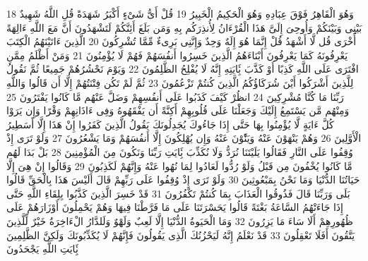 \documentclass[20pt,a4paper]{article}
\begin{document}
{\tiny\colorbox{cl_aya}{18}} وَهُوَ الْقَاهِرُ فَوْقَ عِبَادِهِ وَهُوَ الْحَكِيمُ الْخَبِيرُ
{\tiny\colorbox{cl_aya}{19}} قُلْ أَىُّ شَىْءٍ أَكْبَرُ شَهَدَةً قُلِ اللَّهُ شَهِيدٌ بَيْنِى وَبَيْنَكُمْ وَأُوحِىَ إِلَىَّ هَذَا الْقُرْءَانُ لِأُنذِرَكُم بِهِ وَمَن بَلَغَ أَئِنَّكُمْ لَتَشْهَدُونَ أَنَّ مَعَ اللَّهِ ءَالِهَةً أُخْرَى قُل لَّا أَشْهَدُ قُلْ إِنَّمَا هُوَ إِلَهٌ وَحِدٌ وَإِنَّنِى بَرِىءٌ مِّمَّا تُشْرِكُونَ
{\tiny\colorbox{cl_aya}{20}} الَّذِينَ ءَاتَيْنَهُمُ الْكِتَبَ يَعْرِفُونَهُ كَمَا يَعْرِفُونَ أَبْنَاءَهُمُ الَّذِينَ خَسِرُوا أَنفُسَهُمْ فَهُمْ لَا يُؤْمِنُونَ
{\tiny\colorbox{cl_aya}{21}} وَمَنْ أَظْلَمُ مِمَّنِ افْتَرَى عَلَى اللَّهِ كَذِبًا أَوْ كَذَّبَ بَِٔايَتِهِ إِنَّهُ لَا يُفْلِحُ الظَّلِمُونَ
{\tiny\colorbox{cl_aya}{22}} وَيَوْمَ نَحْشُرُهُمْ جَمِيعًا ثُمَّ نَقُولُ لِلَّذِينَ أَشْرَكُوا أَيْنَ شُرَكَاؤُكُمُ الَّذِينَ كُنتُمْ تَزْعُمُونَ
{\tiny\colorbox{cl_aya}{23}} ثُمَّ لَمْ تَكُن فِتْنَتُهُمْ إِلَّا أَن قَالُوا وَاللَّهِ رَبِّنَا مَا كُنَّا مُشْرِكِينَ
{\tiny\colorbox{cl_aya}{24}} انظُرْ كَيْفَ كَذَبُوا عَلَى أَنفُسِهِمْ وَضَلَّ عَنْهُم مَّا كَانُوا يَفْتَرُونَ
{\tiny\colorbox{cl_aya}{25}} وَمِنْهُم مَّن يَسْتَمِعُ إِلَيْكَ وَجَعَلْنَا عَلَى قُلُوبِهِمْ أَكِنَّةً أَن يَفْقَهُوهُ وَفِى ءَاذَانِهِمْ وَقْرًا وَإِن يَرَوْا كُلَّ ءَايَةٍ لَّا يُؤْمِنُوا بِهَا حَتَّى إِذَا جَاءُوكَ يُجَدِلُونَكَ يَقُولُ الَّذِينَ كَفَرُوا إِنْ هَذَا إِلَّا أَسَطِيرُ الْأَوَّلِينَ
{\tiny\colorbox{cl_aya}{26}} وَهُمْ يَنْهَوْنَ عَنْهُ وَيَنَْٔوْنَ عَنْهُ وَإِن يُهْلِكُونَ إِلَّا أَنفُسَهُمْ وَمَا يَشْعُرُونَ
{\tiny\colorbox{cl_aya}{27}} وَلَوْ تَرَى إِذْ وُقِفُوا عَلَى النَّارِ فَقَالُوا يَلَيْتَنَا نُرَدُّ وَلَا نُكَذِّبَ بَِٔايَتِ رَبِّنَا وَنَكُونَ مِنَ الْمُؤْمِنِينَ
{\tiny\colorbox{cl_aya}{28}} بَلْ بَدَا لَهُم مَّا كَانُوا يُخْفُونَ مِن قَبْلُ وَلَوْ رُدُّوا لَعَادُوا لِمَا نُهُوا عَنْهُ وَإِنَّهُمْ لَكَذِبُونَ
{\tiny\colorbox{cl_aya}{29}} وَقَالُوا إِنْ هِىَ إِلَّا حَيَاتُنَا الدُّنْيَا وَمَا نَحْنُ بِمَبْعُوثِينَ
{\tiny\colorbox{cl_aya}{30}} وَلَوْ تَرَى إِذْ وُقِفُوا عَلَى رَبِّهِمْ قَالَ أَلَيْسَ هَذَا بِالْحَقِّ قَالُوا بَلَى وَرَبِّنَا قَالَ فَذُوقُوا الْعَذَابَ بِمَا كُنتُمْ تَكْفُرُونَ
{\tiny\colorbox{cl_aya}{31}} قَدْ خَسِرَ الَّذِينَ كَذَّبُوا بِلِقَاءِ اللَّهِ حَتَّى إِذَا جَاءَتْهُمُ السَّاعَةُ بَغْتَةً قَالُوا يَحَسْرَتَنَا عَلَى مَا فَرَّطْنَا فِيهَا وَهُمْ يَحْمِلُونَ أَوْزَارَهُمْ عَلَى ظُهُورِهِمْ أَلَا سَاءَ مَا يَزِرُونَ
{\tiny\colorbox{cl_aya}{32}} وَمَا الْحَيَوةُ الدُّنْيَا إِلَّا لَعِبٌ وَلَهْوٌ وَلَلدَّارُ الْءَاخِرَةُ خَيْرٌ لِّلَّذِينَ يَتَّقُونَ أَفَلَا تَعْقِلُونَ
{\tiny\colorbox{cl_aya}{33}} قَدْ نَعْلَمُ إِنَّهُ لَيَحْزُنُكَ الَّذِى يَقُولُونَ فَإِنَّهُمْ لَا يُكَذِّبُونَكَ وَلَكِنَّ الظَّلِمِينَ بَِٔايَتِ اللَّهِ يَجْحَدُونَ
\end{document}
